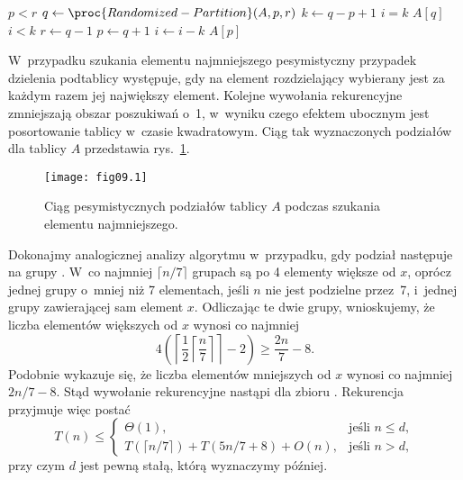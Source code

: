 \exercise %

\exercise %
\begin{codebox}
\li	\While $p<r$
\li		\Do
			$q\gets\proc{Randomized-Partition}(A,p,r)$
\li			$k\gets q-p+1$
\li			\If $i=k$
\li				\Then \Return $A[q]$
				\End
\li			\If $i<k$
\li				\Then $r\gets q-1$
\li				\Else
					$p\gets q+1$
\li					$i\gets i-k$
				\End
		\End
\li	\Return $A[p]$
\end{codebox}

\exercise %
W~przypadku szukania elementu najmniejszego pesymistyczny przypadek dzielenia podtablicy występuje, gdy na element rozdzielający wybierany jest za każdym razem jej największy element. Kolejne wywołania rekurencyjne zmniejszają obszar poszukiwań o~1, w~wyniku czego efektem ubocznym jest posortowanie tablicy w~czasie kwadratowym. Ciąg tak wyznaczonych podziałów dla tablicy $A$ przedstawia rys.~\ref{fig:9.2-4}.

\begin{figure}[ht]
	\begin{center}
		\texttt{[image: fig09.1]}
	\end{center}
	\caption{Ciąg pesymistycznych podziałów tablicy $A$ podczas szukania elementu najmniejszego.} \label{fig:9.2-4}
\end{figure}


\exercise %
Dokonajmy analogicznej analizy algorytmu  w~przypadku, gdy podział następuje na grupy . W~co najmniej $\lceil n/7\rceil$ grupach są po 4 elementy większe od $x$, oprócz jednej grupy o~mniej niż 7 elementach, jeśli $n$ nie jest podzielne przez~7, i~jednej grupy zawierającej sam element $x$. Odliczając te dwie grupy, wnioskujemy, że liczba elementów większych od $x$ wynosi co najmniej
\[
	4\left(\left\lceil\frac{1}{2}\left\lceil\frac{n}{7}\right\rceil\right\rceil-2\right) \ge \frac{2n}{7}-8.
\]
Podobnie wykazuje się, że liczba elementów mniejszych od $x$ wynosi co najmniej $2n/7-8$. Stąd wywołanie rekurencyjne nastąpi dla zbioru . Rekurencja przyjmuje więc postać
\[
	T(n) \le \begin{cases}
		\Theta(1), & \text{jeśli $n\le d$}, \\
		T(\lceil n/7\rceil)+T(5n/7+8)+O(n), & \text{jeśli $n>d$},
	\end{cases}
\]
przy czym $d$ jest pewną stałą, którą wyznaczymy później.

